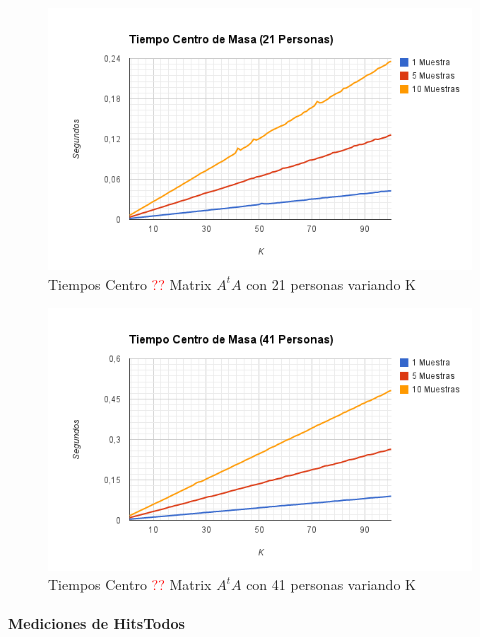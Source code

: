 \begin{figure}[H]
\includegraphics[width=1\textwidth]{img/image8.png}
     \caption{Tiempos Centro \textcolor{red}{??} Matrix $A^tA$ con 21 personas variando K}
     \label{fig:figura1}
\end{figure}

\begin{figure}[H]
\includegraphics[width=1\textwidth]{img/image9.png}
     \caption{Tiempos Centro \textcolor{red}{??} Matrix $A^tA$ con 41 personas variando K}
     \label{fig:figura1}
\end{figure}



\paragraph{Mediciones de HitsTodos }

